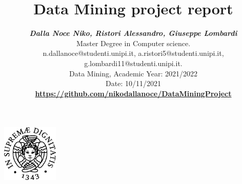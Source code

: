 \documentclass[11pt, letterpaper]{article}  %
\title{\vspace{-2cm}\textbf{Data Mining project report}}
\author{\textbf{\small{\textit{Dalla Noce Niko, Ristori Alessandro, Giuseppe Lombardi}}} \\ %
        \small{Master Degree in Computer science.}\\ \small{{n.dallanoce@studenti.unipi.it, a.ristori5@studenti.unipi.it, g.lombardi11@studenti.unipi.it}.} \\  %
        \small{Data Mining, Academic Year: 2021/2022} \\
        \small{Date: 10/11/2021} \\
       \textbf{\small{\url{https://github.com/nikodallanoce/DataMiningProject}}}
}
\begin{document}
\nocite{*}  %
\date{}
\maketitle
\begin{center}
    \includegraphics[width=0.2\textwidth]{images/unipi.png}\\
    \vspace{0.5cm}
\end{center}
\newpage
\tableofcontents
\newpage
%



\end{document}
